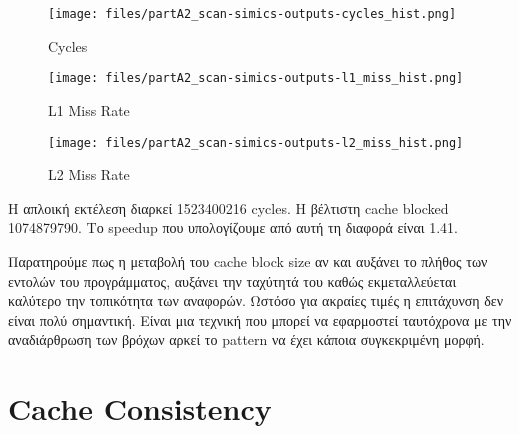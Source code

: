 \documentclass[a4paper,12pt]{article}
\begin{document}
\begin{figure}[H]
	\centering
    \texttt{[image: files/partA2\_scan-simics-outputs-cycles\_hist.png]}
	\caption{Cycles}
	\label{fig:B1}
\end{figure}

\begin{figure}[H]
	\centering
    \texttt{[image: files/partA2\_scan-simics-outputs-l1\_miss\_hist.png]}
    \caption{L1 Miss Rate}
	\label{fig:B2}
\end{figure}

\begin{figure}[H]
	\centering
    \texttt{[image: files/partA2\_scan-simics-outputs-l2\_miss\_hist.png]}
    \caption{L2 Miss Rate}
	\label{fig:B3}
\end{figure}


Η απλοική εκτέλεση διαρκεί 1523400216 cycles. H βέλτιστη cache blocked
1074879790. Το speedup που υπολογίζουμε από αυτή τη διαφορά είναι 1.41.


Παρατηρούμε πως η μεταβολή του cache block size  αν και αυξάνει το πλήθος των
εντολών του προγράμματος, αυξάνει την ταχύτητά του καθώς εκμεταλλεύεται
καλύτερο την τοπικότητα των αναφορών. Ωστόσο για ακραίες τιμές η επιτάχυνση
δεν είναι πολύ σημαντική. Είναι μια τεχνική που μπορεί να εφαρμοστεί
ταυτόχρονα με την αναδιάρθρωση των βρόχων αρκεί το pattern να έχει κάποια
συγκεκριμένη μορφή.


\section*{Cache Consistency}
\end{document}
